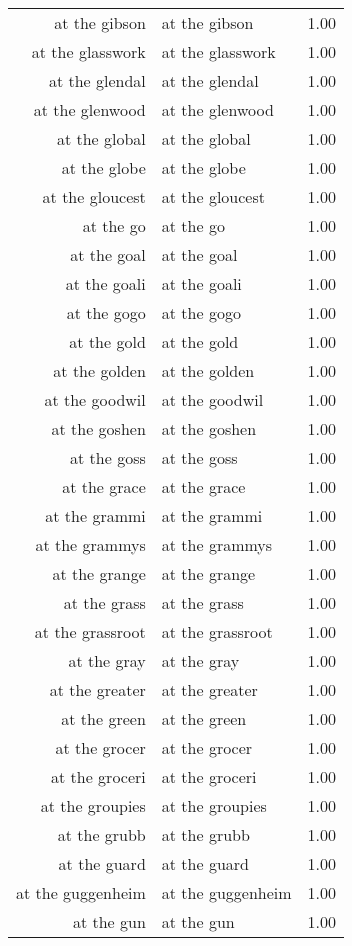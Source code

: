 \begin{table}[ht]
\begin{tabular}{rlr}
  at the gibson & at the gibson & 1.00 \\ 
  at the glasswork & at the glasswork & 1.00 \\ 
  at the glendal & at the glendal & 1.00 \\ 
  at the glenwood & at the glenwood & 1.00 \\ 
  at the global & at the global & 1.00 \\ 
  at the globe & at the globe & 1.00 \\ 
  at the gloucest & at the gloucest & 1.00 \\ 
  at the go & at the go & 1.00 \\ 
  at the goal & at the goal & 1.00 \\ 
  at the goali & at the goali & 1.00 \\ 
  at the gogo & at the gogo & 1.00 \\ 
  at the gold & at the gold & 1.00 \\ 
  at the golden & at the golden & 1.00 \\ 
  at the goodwil & at the goodwil & 1.00 \\ 
  at the goshen & at the goshen & 1.00 \\ 
  at the goss & at the goss & 1.00 \\ 
  at the grace & at the grace & 1.00 \\ 
  at the grammi & at the grammi & 1.00 \\ 
  at the grammys & at the grammys & 1.00 \\ 
  at the grange & at the grange & 1.00 \\ 
  at the grass & at the grass & 1.00 \\ 
  at the grassroot & at the grassroot & 1.00 \\ 
  at the gray & at the gray & 1.00 \\ 
  at the greater & at the greater & 1.00 \\ 
  at the green & at the green & 1.00 \\ 
  at the grocer & at the grocer & 1.00 \\ 
  at the groceri & at the groceri & 1.00 \\ 
  at the groupies & at the groupies & 1.00 \\ 
  at the grubb & at the grubb & 1.00 \\ 
  at the guard & at the guard & 1.00 \\ 
  at the guggenheim & at the guggenheim & 1.00 \\ 
  at the gun & at the gun & 1.00 \\ 

\end{tabular}
\end{table}

